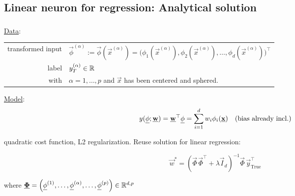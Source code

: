\subsection{Linear neuron for regression: Analytical solution}

\begin{frame}\frametitle{\subsecname}

\underline{Data}:\\

\begin{table}[h]
\begin{tabular}{rl}
transformed input & $\vec \phi^{(\alpha)} := \vec \phi(\vec x^{(\alpha)}) = \big (
\phi_{1}(\vec x^{(\alpha)}), \phi_{2}(\vec x^{(\alpha)}), \ldots, \phi_{d}(\vec x^{(\alpha)}) \big)^{\top}$ \\
label         & $y_{T}^{(\alpha)} \in \mathbb{R}$ \\
with & $\alpha = 1,\ldots,p$ and $\vec x$ has been centered and sphered.
\end{tabular}
\end{table}

\pause

\underline{Model}:\\[-5mm]

\begin{equation}
    y(\underline{\mathbf{\phi}}; \underline{\mathbf{w}}) = \underline{\mathbf{w}}^{\top} \underline{\mathbf{\phi}} = \sum_{i=1}^{d} w_{i} \phi_{i}(\underline{\mathbf{x}})\quad \text{(bias already incl.)}
\end{equation}

quadratic cost function, L2 regularization. \pause Reuse solution for linear regression:

\begin{equation}
\vec w^{*} = \left( \vec \Phi \, \vec \Phi^{\top} + \lambda \vec I_{d}\right)^{-1} \vec \Phi \, \vec y_{\text{True}}^{\top}
\end{equation}

where $\underline{\mathbf{\Phi}} = \left( \underline{\mathbf{\phi}}^{(1)},\ldots, \underline{\mathbf{\phi}}^{(\alpha)},\ldots, \underline{\mathbf{\phi}}^{(p)}\right) \in \mathbb{R}^{d,p}$

\end{frame}

